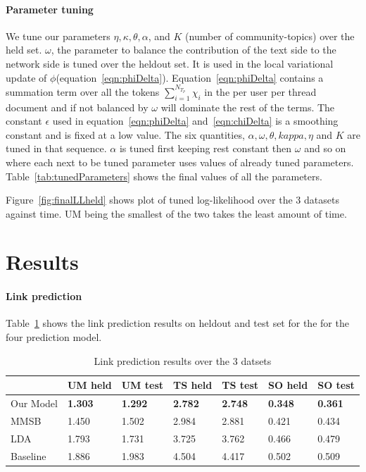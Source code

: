 \documentclass{sig-alternate}
\begin{document}
\paragraph{Parameter tuning}
We tune our parameters $\eta, \kappa,
\theta, \alpha$, and $K$ (number of community-topics) over the held set.
$\omega$, the parameter to balance the contribution of the text side to the 
network side is tuned over the
heldout set. It is used in the local variational update of
$\phi$(equation~\ref{eqn:phiDelta}).
Equation~\ref{eqn:phiDelta} contains a summation term over all the tokens
$\sum_{i=1}^{N_{T_p}}\chi_i$ in the per user per thread document and if  not
balanced by $\omega$ will dominate the rest of the terms. The constant $\epsilon$ used in
equation~\ref{eqn:phiDelta} and~\ref{eqn:chiDelta} is a smoothing constant and
is fixed at a low value. The six quantities, $\alpha, \omega, \theta, kappa,
\eta$ and $K$ are tuned in that sequence. $\alpha$ is tuned first keeping rest
constant then $\omega$ and so on where each next to be tuned parameter uses
values of already tuned parameters. Table~\ref{tab:tunedParameters}
shows the final values of all the parameters.


Figure~\ref{fig:finalLLheld} shows plot of tuned log-likelihood over the 3
datasets against time. UM being the smallest of the two takes
the least amount of time. 

\section{Results}
\paragraph{Link prediction} Table~\ref{tab:predictionResults} shows the link
prediction results on heldout and test set for the for the four prediction
model.
\begin{table}
\begin{center} 
\begin{tabular}{p{1cm}|p{0.7cm}|p{0.7cm}|p{0.7cm}|p{0.7cm}|p{0.7cm}|p{0.7cm}|}
  & UM held & UM test & TS held & TS test & SO held & SO test \\\hline
Our Model & \textbf{1.303} &\textbf{1.292} &\textbf{2.782} & \textbf{2.748} & 
\textbf{0.348}& \textbf{0.361} \\\hline 
MMSB &1.450& 1.502 & 2.984& 2.881 &0.421 & 0.434 \\\hline 
LDA &1.793& 1.731	&3.725 & 3.762 &0.466 & 0.479\\\hline
Baseline &1.886& 1.983 &4.504 &4.417&0.502& 0.509\\\hline
\end{tabular}
\caption{Link prediction results over the 3 datsets }
\label{tab:predictionResults}
\end{center}
\end{table}
\end{document}
